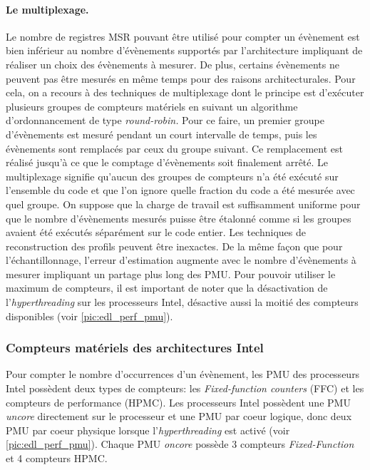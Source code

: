         \paragraph{Le multiplexage.}
        Le nombre de registres MSR pouvant être utilisé pour compter un évènement est bien inférieur au nombre d'évènements supportés par l'architecture impliquant de réaliser un choix des évènements à mesurer. De plus, certains évènements ne peuvent pas être mesurés en même temps pour des raisons architecturales. 
        Pour cela, on a recours à des techniques de multiplexage dont le principe est d'exécuter plusieurs groupes de compteurs matériels en suivant un algorithme d'ordonnancement de type \textit{round-robin.} Pour ce faire, un premier groupe d'évènements est mesuré pendant un court intervalle de temps, puis les évènements sont remplacés par ceux du groupe suivant. Ce remplacement est réalisé jusqu'à ce que le comptage d'évènements soit finalement arrêté. Le multiplexage signifie qu'aucun des groupes de compteurs n'a été exécuté sur l'ensemble du code et que l'on ignore quelle fraction du code a été mesurée avec quel groupe. On suppose que la charge de travail est suffisamment uniforme pour que le nombre d'évènements mesurés puisse être étalonné comme si les groupes avaient été exécutés séparément sur le code entier. 
        Les techniques de reconstruction des profils peuvent être inexactes\cite{Lim}. De la même façon que pour l'échantillonnage, l'erreur d'estimation augmente avec le nombre d'évènements à mesurer impliquant un partage plus long des PMU. Pour pouvoir utiliser le maximum de compteurs, il est important de noter que la désactivation de l'\textit{hyperthreading} sur les processeurs Intel, désactive aussi la moitié des compteurs disponibles (voir \autoref{pic:edl_perf_pmu}).



    \subsubsection{Compteurs matériels des architectures Intel}
        

        Pour compter le nombre d'occurrences d'un évènement, les PMU des processeurs Intel possèdent deux types de compteurs: les \textit{Fixed-function counters} (FFC) et les compteurs de performance (HPMC). Les processeurs Intel possèdent une PMU \textit{uncore} directement sur le processeur et une PMU par coeur logique, donc deux PMU par coeur physique lorsque l'\textit{hyperthreading} est activé (voir \autoref{pic:edl_perf_pmu}). Chaque PMU \textit{oncore} possède 3 compteurs \textit{Fixed-Function} et 4 compteurs HPMC.
        

